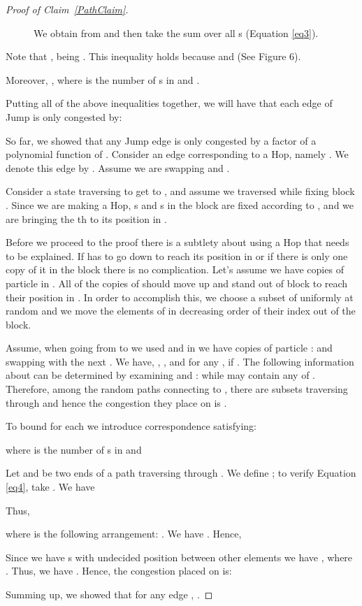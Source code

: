 \documentclass[10 pt]{article}
\begin{document}
\begin{proof}[Proof of Claim~\ref{PathClaim}]
\begin{figure}[!ht]

\centerline{}

\caption{We obtain  from  and then take the sum over all s (Equation \ref{eq3}). }
\end{figure}\label{fig6}
\smallskip
Note that ,   being .
This inequality holds because  and (See Figure 6).

Moreover, , where  is the number of s in  and .

\smallskip
Putting all of the above inequalities together, we will have that each edge of Jump is only congested by:



So far, we showed that any Jump edge is only congested by a factor of a polynomial function of . 
Consider  an edge corresponding to a Hop, namely . We denote this edge by . Assume we are swapping  and .

\medskip

Consider a state  traversing  to get to , and assume we traversed  while fixing block .
Since we are making a Hop,  s and s in the block are fixed according to , and we are  bringing the th   to its position in .

\medskip

Before we proceed to the proof there is a subtlety about using a Hop that needs to be explained. If  has to go down to reach
its position in   or if there is only one copy of it in the block there is no complication. 
Let's assume we have  copies of particle  in . All of the  copies of  should move up and stand out
of block  to reach their position in . In order to accomplish this, we choose a subset  of
 uniformly at random and we move the elements of  in decreasing order of their index out of the block.  

\smallskip

Assume, when going from  to  we used   and in  we have  copies of particle :
 and swapping    with the next .  We have,
, , and for any , if
. 
The following information about  can be determined by examining  and : 
while  may contain any of . Therefore, among the random paths connecting  to ,
there are  subsets traversing through  and hence the congestion they place on 
 is .

 \smallskip

To bound   for each  we introduce correspondence 
  satisfying:

where  is the number of s in  and 

Let  and  be two ends of a path traversing through  . We define ;
to verify Equation \ref{eq4}, take . We have

Thus,

where   is the following arrangement: .
We have . Hence, 


Since we have  s with undecided position between  other elements we have , where . Thus, we have .  Hence, the congestion placed on  is:



Summing up, we showed that for any edge , .

 \end{proof}
 
\end{document}
